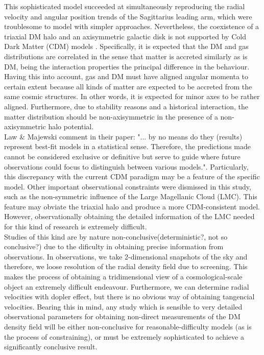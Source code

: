 This sophisticated model succeeded at simultaneously reproducing the radial velocity and angular position trends of the Sagittarius leading arm, which were troublesome to model with simpler approaches. 
Nevertheless, the coexistence of a triaxial DM halo and an axisymmetric galactic disk is not supported by Cold Dark Matter (CDM) models \cite{Debattista et al. 2008}. 
Specifically, it is expected that the DM and gas distributions are correlated in the sense that matter is accreted similarly as is DM, being the interaction properties the principal difference in the behaviour. 
Having this into account, gas and DM must have aligned angular momenta to certain extent because all kinds of matter are expected to be accreted from the same cosmic structures. 
In other words, it is expected for minor axes to be rather aligned. 
Furthermore, due to stability reasons and a historical interaction, the matter distribution should be non-axisymmetric in the presence of a non-axisymmetric halo potential.\\

Law \& Majewski comment in their paper: "... by no means do they (results) represent best-fit models in a statistical sense. Therefore, the predictions made cannot be considered exclusive or definitive but serve to guide where future observations could focus to distinguish between various models.". 
Particularly, this discrepancy with the current CDM paradigm may be a feature of the specific model. 
Other important observational constraints were dismissed in this study, such as the non-symmetric influence of the Large Magellanic Cloud (LMC). 
This feature may obviate the triaxial halo and produce a more CDM-consistent model. 
However, observationally obtaining the detailed information of the LMC needed for this kind of research is extremely difficult.\\

Studies of this kind are by nature non-conclusive(deterministic?, not so conclusive?) due to the dificulty in obtaining precise information from observations. 
In observations, we take 2-dimensional snapshots of the sky and therefore, we loose resolution of the radial density field due to screening. 
This makes the process of obtaining  a tridimensional view of a cosmological-scale object an extremely difficult endeavour. 
Furthermore, we can determine radial velocities with dopler effect, but there is no obvious way of obtaining tangencial velocities. 
Bearing this in mind, any study which is sensible to very detailed observational parameters for obtaining non-direct measurements of the DM density field will be either non-conclusive for reasonable-difficulty models (as is the process of constraining), or must be extremely sophisticated to achieve a significantly conclusive result.\\

